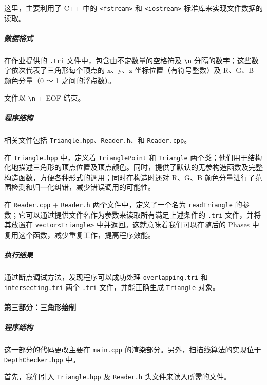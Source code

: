 \documentclass[
]{article}
\begin{document}
这里，主要利用了 C++ 中的 \texttt{\textless{}fstream\textgreater{}} 和
\texttt{\textless{}iostream\textgreater{}} 标准库来实现文件数据的读取。

\hypertarget{header-n25}{%
\subparagraph{数据格式}\label{header-n25}}

在作业提供的 \texttt{.tri} 文件中，包含由不定数量的空格符及
\texttt{\textquotesingle{}\textbackslash{}n\textquotesingle{}}
分隔的数字；这些数字依次代表了三角形每个顶点的 x、y、z
坐标位置（有符号整数）及 R、G、B 颜色分量（0 ～ 1 之间的浮点数）。

文件以 \texttt{\textquotesingle{}\textbackslash{}n\textquotesingle{}} +
EOF 结束。

\hypertarget{header-n28}{%
\subparagraph{程序结构}\label{header-n28}}

相关文件包括 \texttt{Triangle.hpp}、\texttt{Reader.h}、和
\texttt{Reader.cpp}。

在 \texttt{Triangle.hpp} 中，定义着 \texttt{TrianglePoint} 和
\texttt{Triangle}
两个类；他们用于结构化地描述三角形的顶点位置及顶点颜色。同时，提供了默认的无参构造函数及完整构造函数，方便各种形式的调用；同时在构造时还对
R、G、B 颜色分量进行了范围检测和归一化纠错，减少错误调用的可能性。

在 \texttt{Reader.cpp} + \texttt{Reader.h} 两个文件中，定义了一个名为
\texttt{readTriangle}
的参数；它可以通过提供文件名作为参数来读取所有满足上述条件的
\texttt{.tri} 文件，并将其放置在
\texttt{vector\textless{}Triangle\textgreater{}}
中并返回。这就意味着我们可以在随后的 Phases
中复用这个函数，减少重复工作，提高程序效能。

\hypertarget{header-n32}{%
\subparagraph{执行结果}\label{header-n32}}

通过断点调试方法，发现程序可以成功处理 \texttt{overlapping.tri} 和
\texttt{intersecting.tri} 两个 \texttt{.tri} 文件，并能正确生成
\texttt{Triangle} 对象。

\hypertarget{header-n34}{%
\paragraph{第三部分：三角形绘制}\label{header-n34}}

\hypertarget{header-n353}{%
\subparagraph{程序结构}\label{header-n353}}

这一部分的代码更改主要在 \texttt{main.cpp}
的渲染部分。另外，扫描线算法的实现位于 \texttt{DepthChecker.hpp} 中。

首先，我们引入 \texttt{Triangle.hpp} 及 \texttt{Reader.h}
头文件来读入所需的文件。
\end{document}
